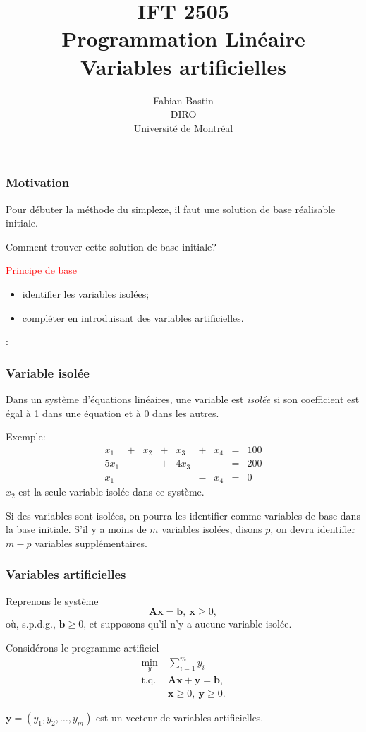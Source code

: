 \documentclass[usepdftitle=false]{beamer}
\title[IFT2505]{IFT 2505\\Programmation Linéaire\\Variables artificielles}
\author[Fabian Bastin]{Fabian Bastin\\DIRO\\Université de Montréal}
\date{}
\def\bb{\boldsymbol{b}}
\def\bx{\boldsymbol{x}}
\def\by{\boldsymbol{y}}
\def\bA{\boldsymbol{A}}
\begin{document}
\frame{\titlepage}


\begin{frame}
\frametitle{Motivation}

Pour débuter la méthode du simplexe, il faut une solution de base réalisable initiale.

\mbox{}

Comment trouver cette solution de base initiale?

\mbox{}

\textcolor{red}{Principe de base}
\begin{itemize}
	\item
	identifier les variables isolées;
	\item
compléter en introduisant des variables artificielles.
\end{itemize}:

\end{frame}

\begin{frame}
\frametitle{Variable isolée}

Dans un système d'équations linéaires, une variable est {\em isolée} si son coefficient est égal à 1 dans une équation et à 0 dans les autres.

\mbox{}

Exemple:
$$
\begin{matrix}
x_1 & + & x_2 & + & x_3 & + &  x_4 & = & 100 \\
5x_1 & & & + & 4x_3 & & & = & 200 \\
x_1 & & & & & -  & x_4 & = & 0
\end{matrix}
$$
$x_2$ est la seule variable isolée dans ce système.

\mbox{}

Si des variables sont isolées, on pourra les identifier comme variables de base dans la base initiale. S'il y a moins de $m$ variables isolées, disons $p$, on devra identifier $m-p$ variables supplémentaires.
\end{frame}

\begin{frame}
\frametitle{Variables artificielles}

Reprenons le système
\[
\bA\bx = \bb, \ \bx \geq 0,
\]
où, s.p.d.g., $\bb \geq 0$, et supposons qu'il n'y a aucune variable isolée.

\mbox{}

Considérons le programme artificiel
\begin{align*}
\min_y \ & \sum_{i = 1}^m y_i\\
\mbox{t.q. } & \bA\bx + \by = \bb,\\
& \bx \geq 0, \ \by \geq 0.
\end{align*}

$\by = (y_1, y_2,\ldots, y_m)$ est un vecteur de variables artificielles.

\end{frame}
\end{document}
